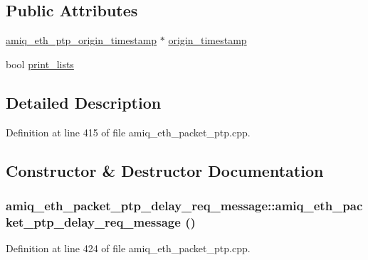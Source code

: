 \subsection*{Public Attributes}
\begin{DoxyCompactItemize}
\item 
\hyperlink{amiq__eth__types_8cpp_add82721f4ff373d2b82269bbf5941032}{amiq\_\-eth\_\-ptp\_\-origin\_\-timestamp} $\ast$ \hyperlink{classamiq__eth__packet__ptp__delay__req__message_a7cb4eb7b14be4ac43a1628330093184c}{origin\_\-timestamp}
\item 
bool \hyperlink{classamiq__eth__packet__ptp__delay__req__message_a1f833793f6438b06b6f26ce40ae1cd83}{print\_\-lists}
\end{DoxyCompactItemize}


\subsection{Detailed Description}


Definition at line 415 of file amiq\_\-eth\_\-packet\_\-ptp.cpp.

\subsection{Constructor \& Destructor Documentation}
\hypertarget{classamiq__eth__packet__ptp__delay__req__message_a87e28dcb09619404e683577e2aff94d3}{
\subsubsection[{amiq\_\-eth\_\-packet\_\-ptp\_\-delay\_\-req\_\-message}]{\setlength{\rightskip}{0pt plus 5cm}amiq\_\-eth\_\-packet\_\-ptp\_\-delay\_\-req\_\-message::amiq\_\-eth\_\-packet\_\-ptp\_\-delay\_\-req\_\-message ()}}
\label{classamiq__eth__packet__ptp__delay__req__message_a87e28dcb09619404e683577e2aff94d3}


Definition at line 424 of file amiq\_\-eth\_\-packet\_\-ptp.cpp.

